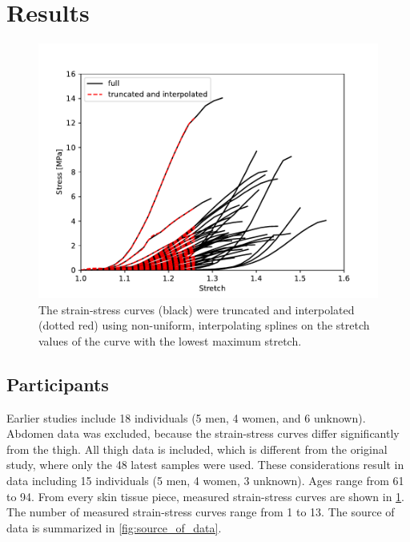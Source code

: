 \section{Results}

\begin{figure}
    \centering
    \includegraphics[width=\linewidth]{skinstression/images/truncated-and-interpolated-curves.pdf}
    \caption[Truncated and spline interpolated curves]{
        The strain-stress curves (black) were truncated and interpolated (dotted red)
        using non-uniform, interpolating splines on the stretch values of the curve with the lowest maximum stretch.
    }
    \label{fig:trunc_interp_curves}
\end{figure}

\subsection{Participants}\label{subsec:results_participants}

Earlier studies  include 18 individuals (5 men, 4 women, and 6 unknown).
Abdomen data was excluded, because the strain-stress curves differ significantly from the thigh.
All thigh data is included, which is different from the original study, where only the 48 latest samples were used.
These considerations result in data including 15 individuals (5 men, 4 women, 3 unknown).
Ages range from 61 to 94.
From every skin tissue piece, measured strain-stress curves are shown in \cref{fig:trunc_interp_curves}.
The number of measured strain-stress curves range from 1 to 13.
The source of data is summarized in \cref{fig:source_of_data}.

